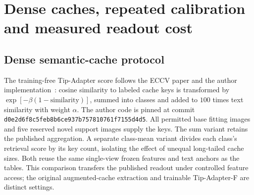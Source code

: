 \documentclass[preprint,review,12pt]{elsarticle}
\begin{document}
\begin{table}[htbp]
\centering
\caption{ImageNet-R matched-retention recognition at three budgets after five arrivals. Values are percentages, mean $\pm$ partition-level sample standard deviation over feasible partitions. Counts specify available partition sets.}
\label{tab:imagenetrfull}
\resizebox{\linewidth}{!}{}
\end{table}

\begin{table}[htbp]
\centering
\caption{ImageNet-R test outcomes with the 95\% base-validation-only threshold policy. Validation feasibility is reported separately from achieved test accuracy. Tip-Adapter uses its base-only selected calibrated cache settings, followed by validation-only threshold selection.}
\label{tab:imagenetrvalidation}
\resizebox{\linewidth}{!}{}
\end{table}
\begin{table}[htbp]
\centering
\caption{FeNeC matched-test-retention operating points at strict budgets. Values are percentages, mean $\pm$ sample standard deviation over feasible partitions; missing values have zero feasible partitions. Native and offset-calibrated forms share a score matrix and hence the same complete offset-sweep frontier.}
\label{tab:fenecfrontiers}
\resizebox{\linewidth}{!}{}
\end{table}

\FloatBarrier
\section{Dense caches, repeated calibration and measured readout cost}
\label{app:depth}
\subsection{Dense semantic-cache protocol}
The training-free Tip-Adapter score follows the ECCV paper and the author
implementation~\cite{zhang2022tipadapter}: cosine similarity to labeled cache keys
is transformed by $\exp[-\beta(1-\mathrm{similarity})]$, summed into classes and
added to $100$ times text similarity with weight $\alpha$. The author code is
pinned at commit \nolinkurl{d0e2d6f8c5feb8b6ce937b757810761f7155d4d5}.
All permitted base fitting images and five reserved novel support images supply
the keys. The sum variant retains the published aggregation. A separate
class-mean variant divides each class's retrieval score by its key count,
isolating the effect of unequal long-tailed cache sizes. Both reuse the same
single-view frozen features and text anchors as the tables. This comparison
transfers the published readout under controlled feature access; the original
augmented-cache extraction and trainable Tip-Adapter-F are distinct settings.
\end{document}
